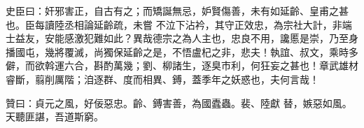 \begin{pinyinscope}
 史臣曰：奸邪害正，自古有之；而矯誕無忌，妒賢傷善，未有如延齡、皇甫之甚也。臣每讀陸丞相論延齡疏，未嘗
 不泣下沾衿，其守正效忠，為宗社大計，非端士益友，安能感激犯難如此？異哉德宗之為人主也，忠良不用，讒慝是崇，乃至身播國屯，幾將覆滅，尚獨保延齡之是，不悟盧杞之非，悲夫！執誼、叔文，乘時多僻，而欲斡運六合，斟酌萬幾；劉、柳諸生，逐臭市利，何狂妄之甚也！章武雄材睿斷，翦削厲階；洎逐群、度而相異、鎛，蓋季年之妖惑也，夫何言哉！



 贊曰：貞元之風，好佞惡忠。齡、鎛害善，為國蠹蟲。裴、陸獻
 替，嫉惡如風。天聽匪諶，吾道斯窮。



\end{pinyinscope}